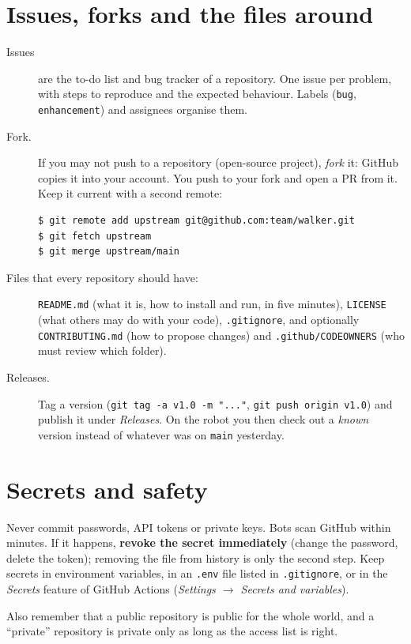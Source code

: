 \section*{Issues, forks and the files around}
\begin{description}
  \item[Issues] are the to-do list and bug tracker of a repository. One issue per problem, with steps to reproduce and the expected behaviour. Labels (\texttt{bug}, \texttt{enhancement}) and assignees organise them.
  \item[Fork.] If you may not push to a repository (open-source project), \emph{fork} it: GitHub copies it into your account. You push to your fork and open a PR from it. Keep it current with a second remote:
\begin{verbatim}
$ git remote add upstream git@github.com:team/walker.git
$ git fetch upstream
$ git merge upstream/main
\end{verbatim}
  \item[Files that every repository should have:] \texttt{README.md} (what it is, how to install and run, in five minutes), \texttt{LICENSE} (what others may do with your code), \texttt{.gitignore}, and optionally \texttt{CONTRIBUTING.md} (how to propose changes) and \texttt{.github/CODEOWNERS} (who must review which folder).
  \item[Releases.] Tag a version (\verb!git tag -a v1.0 -m "..."!, \verb!git push origin v1.0!) and publish it under \emph{Releases}. On the robot you then check out a \emph{known} version instead of whatever was on \texttt{main} yesterday.
\end{description}

\section*{Secrets and safety}
\begin{keyidea}
Never commit passwords, API tokens or private keys. Bots scan GitHub within minutes. If it happens, \textbf{revoke the secret immediately} (change the password, delete the token); removing the file from history is only the second step. Keep secrets in environment variables, in an \texttt{.env} file listed in \texttt{.gitignore}, or in the \emph{Secrets} feature of GitHub Actions (\emph{Settings $\rightarrow$ Secrets and variables}).
\end{keyidea}
Also remember that a public repository is public for the whole world, and a ``private'' repository is private only as long as the access list is right.

